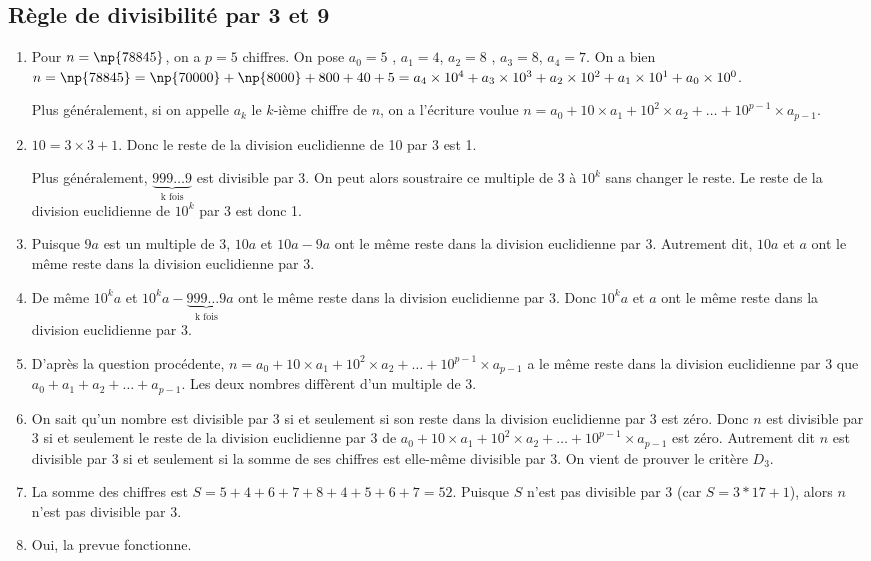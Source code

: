\documentclass[a4paper,12pt, french, noSujetB]{article}
\begin{document}
\vspace{-3mm}
\subsection*{Règle de divisibilité par 3 et 9}
\begin{enumerate}
	\item Pour $n=\np{78845}$, on a $p=5$ chiffres. On pose $a_0=5$ , $a_1=4$, $a_2=8$ , $a_3=8$, $a_4=7$. On a bien $n=\np{78845} = \np{70000} + \np{8000} +800+40+5 = a_4\times 10^4+a_3\times 10^3+a_2\times 10^2+a_1\times 10^1+a_0\times 10^0$.

	Plus généralement, si on appelle $a_k$ le $k$-ième chiffre de $n$, on a l'écriture voulue $n=a_0 + 10\times a_1  +10^2\times a_2+\dots+10^{p-1}\times a_{p-1}$.
	\item $10=3\times3+1$. Donc le reste de la division euclidienne de 10 par 3 est 1.
	
	Plus généralement, $\underbrace{999\dots 9}_{\text{k fois}}$ est divisible par 3. On peut alors soustraire ce multiple de 3 à $10^k$ sans changer le reste. Le reste de la division euclidienne de $10^k$ par 3 est donc 1.
	
	\item Puisque $9a$ est un multiple de 3, $10a$ et $10a-9a$ ont le même reste dans la division euclidienne par 3. Autrement dit, $10a$ et $a$ ont le même reste dans la division euclidienne par 3.
	\item De même $10^ka$ et $10^ka-\underbrace{999\dots 9}_{\text{k fois}}a$ ont le même reste dans la division euclidienne par 3. Donc $10^ka$ et $a$ ont le même reste dans la division euclidienne par 3. 

	\item D'après la question procédente, $n=a_0 + 10\times a_1  +10^2\times a_2+\dots+10^{p-1}\times a_{p-1}$ a le même reste dans la division euclidienne par 3 que $a_0 +  a_1  +a_2+\dots+ a_{p-1}$. Les deux nombres diffèrent d'un multiple de 3.
	\item On sait qu'un nombre est divisible par 3 si et seulement si son reste dans la division euclidienne par 3 est zéro. Donc $n$ est divisible par 3 si et seulement le reste de la division euclidienne par 3 de $a_0 + 10\times a_1  +10^2\times a_2+\dots+10^{p-1}\times a_{p-1}$ est zéro. Autrement dit $n$ est divisible par $3$ si et seulement si la somme de ses chiffres est elle-même divisible par 3. On vient de prouver le critère $D_3$.
	\item La somme des chiffres est $S=5+4+6+7+8+4+5+6+7=52$. Puisque $S$ n'est pas divisible par 3 (car $S=3*17+1$), alors $n$ n'est pas divisible par 3.
	\item Oui, la prevue fonctionne.
\end{enumerate}
\end{document}
